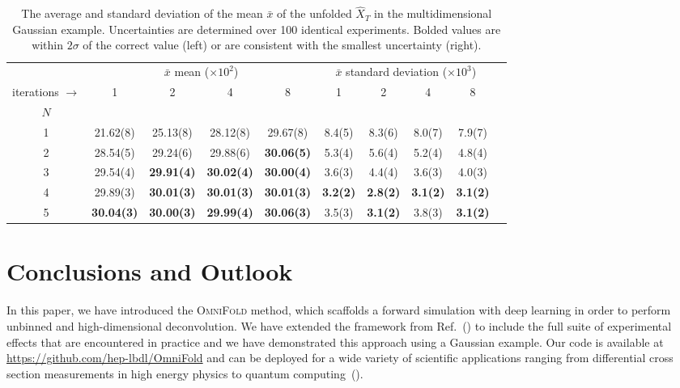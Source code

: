 \documentclass{article} %
\begin{document}
\begin{table}[]
    \centering
    \begin{tabular}{ccccc|ccccc}
     & \multicolumn{4}{c}{$\bar{x}$ mean ($\times 10^2$)} & \multicolumn{4}{c}{$\bar{x}$ standard deviation ($\times 10^3$)}  \\
    iterations $\rightarrow$ & 1 & 2 & 4 & 8 & 1 & 2 & 4 & 8\\
    $N$   &  &&&&&&&\\ 
    \hline
1 & 21.62(8)& 25.13(8)& 28.12(8)& 29.67(8) & 8.4(5)& 8.3(6)& 8.0(7)& 7.9(7) \\
2 & 28.54(5)& 29.24(6)& 29.88(6)& \textbf{30.06(5)} & 5.3(4)& 5.6(4)& 5.2(4)& 4.8(4) \\
3 & 29.54(4)& \textbf{29.91(4)}& \textbf{30.02(4)}& \textbf{30.00(4)} & 3.6(3)& 4.4(4)& 3.6(3)& 4.0(3) \\
4 & 29.89(3)& \textbf{30.01(3)}& \textbf{30.01(3)}& \textbf{30.01(3)} & \textbf{3.2(2)}& \textbf{2.8(2)}& \textbf{3.1(2)}& \textbf{3.1(2)} \\
5 & \textbf{30.04(3)}& \textbf{30.00(3)}& \textbf{29.99(4)}& \textbf{30.06(3)} & 3.5(3)& \textbf{3.1(2)}& 3.8(3)& \textbf{3.1(2)} \\
    \end{tabular}
    \caption{The average and standard deviation of the mean $\bar{x}$ of the unfolded $\hat{X}_T$ in the multidimensional Gaussian example.  Uncertainties are determined over 100 identical experiments.  Bolded values are within $2\sigma$ of the correct value (left) or are consistent with the smallest uncertainty (right).}
    \label{tab:my_table}
\end{table}

\section{Conclusions and Outlook}
\label{sec:conclusions}

In this paper, we have introduced the \textsc{OmniFold} method, which scaffolds a forward simulation with deep learning in order to perform unbinned and high-dimensional deconvolution.  We have extended the framework from Ref.~(\cite{Andreassen:2019cjw}) to include the full suite of experimental effects that are encountered in practice and we have demonstrated this approach using a Gaussian example.  Our code is available at \url{https://github.com/hep-lbdl/OmniFold} and can be deployed for a wide variety of scientific applications ranging from differential cross section measurements in high energy physics to quantum computing~(\cite{1910.01969}).
\end{document}
